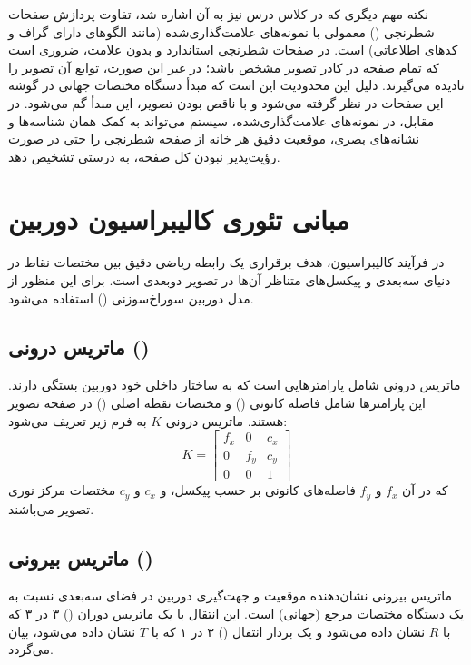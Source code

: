 \documentclass[12pt,a4paper]{article}
\begin{document}
نکته مهم دیگری که در کلاس درس نیز به آن اشاره شد، تفاوت پردازش صفحات شطرنجی () معمولی با نمونه‌های علامت‌گذاری‌شده (مانند الگوهای دارای گراف و کدهای اطلاعاتی) است. در صفحات شطرنجی استاندارد و بدون علامت، ضروری است که تمام صفحه در کادر تصویر مشخص باشد؛ در غیر این صورت، توابع  آن تصویر را نادیده می‌گیرند. دلیل این محدودیت این است که مبدأ دستگاه مختصات جهانی در گوشه این صفحات در نظر گرفته می‌شود و با ناقص بودن تصویر، این مبدأ گم می‌شود. در مقابل، در نمونه‌های علامت‌گذاری‌شده، سیستم می‌تواند به کمک همان شناسه‌ها و نشانه‌های بصری، موقعیت دقیق هر خانه از صفحه شطرنجی را حتی در صورت رؤیت‌پذیر نبودن کل صفحه، به درستی تشخیص دهد.

\section{مبانی تئوری کالیبراسیون دوربین}
در فرآیند کالیبراسیون، هدف برقراری یک رابطه ریاضی دقیق بین مختصات نقاط در دنیای سه‌بعدی و پیکسل‌های متناظر آن‌ها در تصویر دوبعدی است. برای این منظور از مدل دوربین سوراخ‌سوزنی () استفاده می‌شود.

\subsection{ماتریس درونی ()}
ماتریس درونی شامل پارامترهایی است که به ساختار داخلی خود دوربین بستگی دارند. این پارامترها شامل فاصله کانونی () و مختصات نقطه اصلی () در صفحه تصویر هستند. ماتریس درونی $K$ به فرم زیر تعریف می‌شود:
\begin{equation}
K = \begin{bmatrix} f_x & 0 & c_x \\ 0 & f_y & c_y \\ 0 & 0 & 1 \end{bmatrix}
\end{equation}
که در آن $f_x$ و $f_y$ فاصله‌های کانونی بر حسب پیکسل، و $c_x$ و $c_y$ مختصات مرکز نوری تصویر می‌باشند.

\subsection{ماتریس بیرونی ()}
ماتریس بیرونی نشان‌دهنده موقعیت و جهت‌گیری دوربین در فضای سه‌بعدی نسبت به یک دستگاه مختصات مرجع (جهانی) است. این انتقال با یک ماتریس دوران () ۳ در ۳ که با $R$ نشان داده می‌شود و یک بردار انتقال () ۳ در ۱ که با $T$ نشان داده می‌شود، بیان می‌گردد. 
\end{document}
